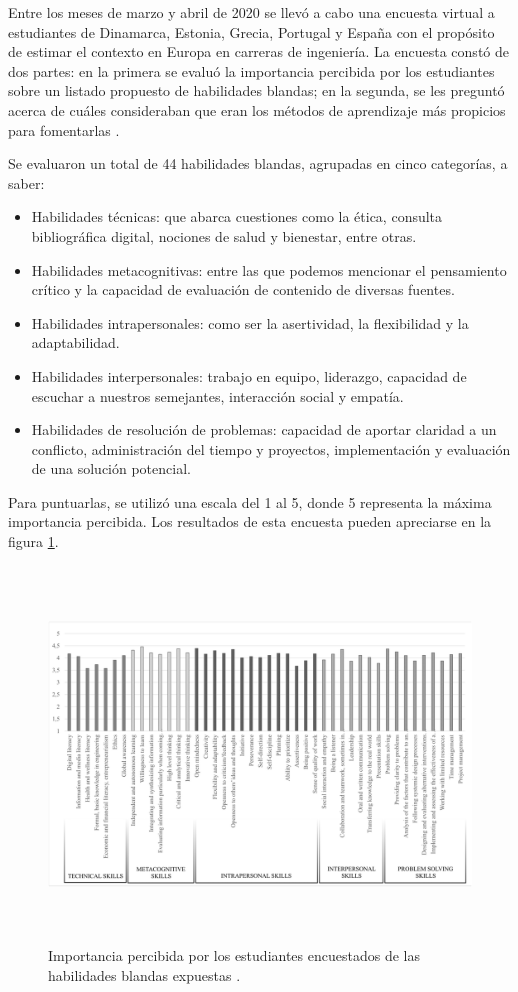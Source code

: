 \documentclass[conference]{IEEEtran}
\begin{document}
Entre los meses de marzo y abril de 2020 se llevó a cabo una encuesta virtual a estudiantes de Dinamarca, Estonia, Grecia, Portugal y España con el propósito de estimar el contexto en Europa en carreras de ingeniería. La encuesta constó de dos partes: en la primera se evaluó la importancia percibida por los estudiantes sobre un listado propuesto de habilidades blandas; en la segunda, se les preguntó acerca de cuáles consideraban que eran los métodos de aprendizaje más propicios para fomentarlas \cite{b2}.

Se evaluaron un total de 44 habilidades blandas, agrupadas en cinco categorías, a saber:

\begin{itemize}
    \item Habilidades técnicas: que abarca cuestiones como la ética, consulta bibliográfica digital, nociones de salud y bienestar, entre otras.
    \item Habilidades metacognitivas: entre las que podemos mencionar el pensamiento crítico y la capacidad de evaluación de contenido de diversas fuentes.
    \item Habilidades intrapersonales: como ser la asertividad, la flexibilidad y la adaptabilidad.
    \item Habilidades interpersonales: trabajo en equipo, liderazgo, capacidad de escuchar a nuestros semejantes, interacción social y empatía.
    \item Habilidades de resolución de problemas: capacidad de aportar claridad a un conflicto, administración del tiempo y proyectos, implementación y evaluación de una solución potencial.
\end{itemize}

Para puntuarlas, se utilizó una escala del 1 al 5, donde 5 representa la máxima importancia percibida. Los resultados de esta encuesta pueden apreciarse en la figura \ref{fig:importancia_percibida}.


\begin{figure}[htbp]
\centering
\includegraphics[width=450pt,height=282pt]{encuesta_soft_skills.png}
\caption{Importancia percibida por los estudiantes encuestados de las habilidades blandas expuestas \cite{b2}.}
\label{fig:importancia_percibida}
\end{figure}
\end{document}
